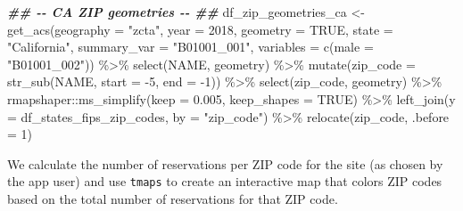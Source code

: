 \documentclass[
  11 pt,
  openany]{book}
\newenvironment{Shaded}{\begin{snugshade}}{\end{snugshade}}
\newcommand{\AttributeTok}[1]{\textcolor[rgb]{0.77,0.63,0.00}{#1}}
\newcommand{\ConstantTok}[1]{\textcolor[rgb]{0.00,0.00,0.00}{#1}}
\newcommand{\DecValTok}[1]{\textcolor[rgb]{0.00,0.00,0.81}{#1}}
\newcommand{\DocumentationTok}[1]{\textcolor[rgb]{0.56,0.35,0.01}{\textbf{\textit{#1}}}}
\newcommand{\FloatTok}[1]{\textcolor[rgb]{0.00,0.00,0.81}{#1}}
\newcommand{\FunctionTok}[1]{\textcolor[rgb]{0.00,0.00,0.00}{#1}}
\newcommand{\NormalTok}[1]{#1}
\newcommand{\OtherTok}[1]{\textcolor[rgb]{0.56,0.35,0.01}{#1}}
\newcommand{\SpecialCharTok}[1]{\textcolor[rgb]{0.00,0.00,0.00}{#1}}
\newcommand{\StringTok}[1]{\textcolor[rgb]{0.31,0.60,0.02}{#1}}
\begin{document}
\begin{Shaded}
\begin{Highlighting}[]
\DocumentationTok{\#\# {-}{-} CA ZIP geometries {-}{-} \#\#}
\NormalTok{df\_zip\_geometries\_ca }\OtherTok{\textless{}{-}} \FunctionTok{get\_acs}\NormalTok{(}\AttributeTok{geography =} \StringTok{"zcta"}\NormalTok{, }\AttributeTok{year =} \DecValTok{2018}\NormalTok{, }\AttributeTok{geometry =} \ConstantTok{TRUE}\NormalTok{,}
                                \AttributeTok{state =} \StringTok{"California"}\NormalTok{,}
                                \AttributeTok{summary\_var =} \StringTok{"B01001\_001"}\NormalTok{,}
                                \AttributeTok{variables =} \FunctionTok{c}\NormalTok{(}\AttributeTok{male =} \StringTok{"B01001\_002"}\NormalTok{)) }\SpecialCharTok{\%\textgreater{}\%}
  \FunctionTok{select}\NormalTok{(NAME, geometry) }\SpecialCharTok{\%\textgreater{}\%}
  \FunctionTok{mutate}\NormalTok{(}\AttributeTok{zip\_code =} \FunctionTok{str\_sub}\NormalTok{(NAME, }\AttributeTok{start =} \SpecialCharTok{{-}}\DecValTok{5}\NormalTok{, }\AttributeTok{end =} \SpecialCharTok{{-}}\DecValTok{1}\NormalTok{)) }\SpecialCharTok{\%\textgreater{}\%}
  \FunctionTok{select}\NormalTok{(zip\_code, geometry) }\SpecialCharTok{\%\textgreater{}\%} 
\NormalTok{  rmapshaper}\SpecialCharTok{::}\FunctionTok{ms\_simplify}\NormalTok{(}\AttributeTok{keep =} \FloatTok{0.005}\NormalTok{, }\AttributeTok{keep\_shapes =} \ConstantTok{TRUE}\NormalTok{) }\SpecialCharTok{\%\textgreater{}\%} 
  \FunctionTok{left\_join}\NormalTok{(}\AttributeTok{y =}\NormalTok{ df\_states\_fips\_zip\_codes,}
            \AttributeTok{by =} \StringTok{"zip\_code"}\NormalTok{) }\SpecialCharTok{\%\textgreater{}\%} 
  \FunctionTok{relocate}\NormalTok{(zip\_code, }\AttributeTok{.before =} \DecValTok{1}\NormalTok{)}
\end{Highlighting}
\end{Shaded}

We calculate the number of reservations per ZIP code for the site (as chosen by the app user) and use \texttt{tmaps} to create an interactive map that colors ZIP codes based on the total number of reservations for that ZIP code.
\end{document}
